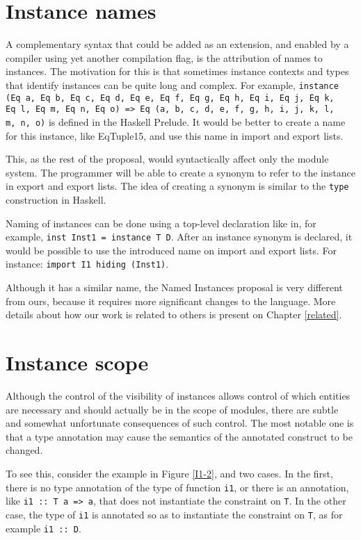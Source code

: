 \documentclass[msc]{ppgccufmg}
\begin{document}
\section{Instance names}
\label{Instance-names}
A complementary syntax that could be added as an extension, and
enabled by a compiler using yet another compilation flag, is the
attribution of names to instances.  The motivation for this is that
sometimes instance contexts and types that identify instances can be
quite long and complex.  For example, \texttt{instance (Eq a, Eq b, Eq
  c, Eq d, Eq e, Eq f, Eq g, Eq h, Eq i, Eq j, Eq k,\\Eq l, Eq m, Eq n,
  Eq o) => Eq (a, b, c, d, e, f, g, h, i, j, k, l,\\m, n, o)} is
defined in the Haskell Prelude.  It would be better to create a name for
this instance, like EqTuple15, and use this name in import and export
lists.

This, as the rest of the proposal, would syntactically affect only the module
system.  The programmer will be able to create a synonym to refer to the
instance in export and export lists.  The idea of creating a synonym is similar
to the \texttt{type} construction in Haskell.

Naming of instances can be done using a top-level declaration like in, for
example, \texttt{inst Inst1 = instance
  T D}.  After an instance synonym is declared, it would be possible to use the
introduced name on import and export lists.  For instance: \texttt{import
  I1 hiding (Inst1)}.

Although it has a similar name, the Named Instances proposal
\citep{named} is very different from ours, because it requires more
significant changes to the language.  More details about how our work
is related to others is present on Chapter \ref{related}.

\section{Instance scope}
Although the control of the visibility of instances allows control of
which entities are necessary and should actually be in the scope of
modules, there are subtle and somewhat unfortunate consequences of
such control. The most notable one is that a type annotation may cause
the semantics of the annotated construct to be changed. 

To see this, consider the example in Figure \ref{I1-2}, and two cases.
In the first, there is no type annotation of the type of function
\texttt{i1}, or there is an annotation, like \texttt{i1 :: T a => a},
that does not instantiate the constraint on \texttt{T}.  In the other
case, the type of \texttt{i1} is annotated so as to instantiate the
constraint on \texttt{T}, as for example \texttt{i1 :: D}.
\end{document}
